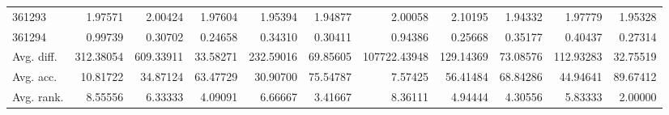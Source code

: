\begin{tabular}{lrrrrrrrrrr}
361293 & 1.97571 & 2.00424 & 1.97604 & 1.95394 & 1.94877 & 2.00058 & 2.10195 & 1.94332 & 1.97779 & 1.95328 \\
361294 & 0.99739 & 0.30702 & 0.24658 & 0.34310 & 0.30411 & 0.94386 & 0.25668 & 0.35177 & 0.40437 & 0.27314 \\
Avg. diff. & 312.38054 & 609.33911 & 33.58271 & 232.59016 & 69.85605 & 107722.43948 & 129.14369 & 73.08576 & 112.93283 & 32.75519 \\
Avg. acc. & 10.81722 & 34.87124 & 63.47729 & 30.90700 & 75.54787 & 7.57425 & 56.41484 & 68.84286 & 44.94641 & 89.67412 \\
Avg. rank. & 8.55556 & 6.33333 & 4.09091 & 6.66667 & 3.41667 & 8.36111 & 4.94444 & 4.30556 & 5.83333 & 2.00000 \\
\bottomrule
\end{tabular}
